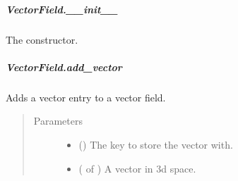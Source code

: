 \documentclass[letterpaper,10pt,english]{sphinxmanual}
\begin{document}
\begin{fulllineitems}
\subparagraph{VectorField.\_\_init\_\_}
\label{\detokenize{api/generated/directional_clustering.fields.VectorField.__init__:vectorfield-init}}\label{\detokenize{api/generated/directional_clustering.fields.VectorField.__init__::doc}}

\begin{fulllineitems}
\label{\detokenize{api/generated/directional_clustering.fields.VectorField.__init__:directional_clustering.fields.VectorField.__init__}}
The constructor.

\end{fulllineitems}



\subparagraph{VectorField.add\_vector}
\label{\detokenize{api/generated/directional_clustering.fields.VectorField.add_vector:vectorfield-add-vector}}\label{\detokenize{api/generated/directional_clustering.fields.VectorField.add_vector::doc}}

\begin{fulllineitems}
\label{\detokenize{api/generated/directional_clustering.fields.VectorField.add_vector:directional_clustering.fields.VectorField.add_vector}}
Adds a vector entry to a vector field.
\begin{quote}\begin{description}
\item[{Parameters}] \leavevmode\begin{itemize}
\item {} 
 () \textendash{} The key to store the vector with.

\item {} 
 ( of ) \textendash{} A vector in 3d space.

\end{itemize}

\end{description}\end{quote}


\end{fulllineitems}
\end{fulllineitems}
\end{document}
